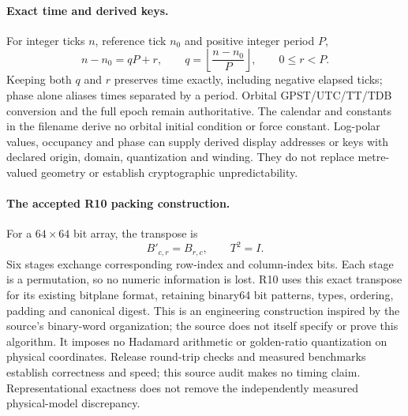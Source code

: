 \paragraph{Exact time and derived keys.}
For integer ticks $n$, reference tick $n_0$ and positive integer period $P$,
\[
n-n_0=qP+r,\qquad q=\left\lfloor\frac{n-n_0}{P}\right\rfloor,
\qquad 0\le r<P.
\]
Keeping both $q$ and $r$ preserves time exactly, including negative elapsed
ticks; phase alone aliases times separated by a period. Orbital GPST/UTC/TT/TDB
conversion and the full epoch remain authoritative. The calendar and constants
in the filename derive no orbital initial condition or force constant.
Log-polar values, occupancy and phase can supply derived display addresses or
keys with declared origin, domain, quantization and winding. They do not replace
metre-valued geometry or establish cryptographic unpredictability.

\paragraph{The accepted R10 packing construction.}
For a $64\times64$ bit array, the transpose is
\[
B'_{c,r}=B_{r,c},\qquad T^2=I.
\]
Six stages exchange corresponding row-index and column-index bits. Each stage
is a permutation, so no numeric information is lost. R10 uses this exact
transpose for its existing bitplane format, retaining binary64 bit patterns,
types, ordering, padding and canonical digest. This is an engineering
construction inspired by the source's binary-word organization; the source
does not itself specify or prove this algorithm. It imposes no Hadamard
arithmetic or golden-ratio quantization on physical coordinates. Release
round-trip checks and measured benchmarks establish correctness and speed;
this source audit makes no timing claim. Representational exactness does not
remove the independently measured physical-model discrepancy.
